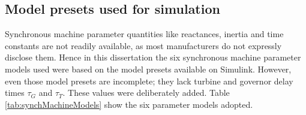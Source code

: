 	\subsection{Model presets used for simulation}

	Synchronous machine parameter quantities like reactances, inertia and time constants are not readily available, as most manufacturers do not expressly disclose them. Hence in this dissertation the six synchronous machine parameter models used were based on the model presets available on Simulink. However, even those model presets are incomplete; they lack turbine and governor delay times $\tau_G$ and $\tau_T$. These values were deliberately added. Table \ref{tab:synchMachineModels} show the six parameter models adopted.

